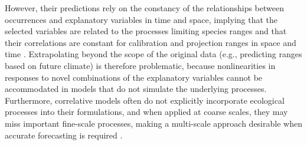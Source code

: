 However, their predictions rely on the constancy of the relationships between occurrences and explanatory variables in time and space, implying that the selected variables are related to the processes limiting species ranges and that their correlations are constant for calibration and projection ranges in space and time \citep{Dormann2007}. 
Extrapolating beyond the scope of the original data (e.g., predicting ranges based on future climate) is therefore problematic, because nonlinearities in responses to novel combinations of the explanatory variables cannot be accommodated in models that do not simulate the underlying processes.
Furthermore, correlative models often do not explicitly incorporate ecological processes into their formulations, and when applied at coarse scales, they may miss important fine-scale processes, making a multi-scale approach desirable when accurate forecasting is required \citep{Austin2007, Austin2011, Soranno2014}.

